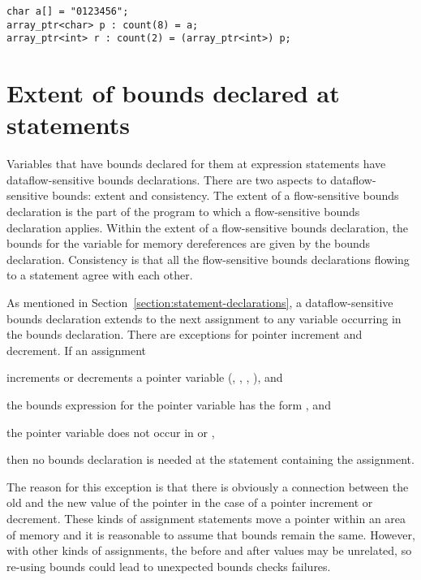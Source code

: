 \begin{lstlisting}
char a[] = "0123456";
array_ptr<char> p : count(8) = a;
array_ptr<int> r : count(2) = (array_ptr<int>) p;
\end{lstlisting}

\section{Extent of bounds declared at statements}
\label{section:extent-of-declarations}

Variables that have bounds declared for them at expression statements
have dataflow-sensitive bounds declarations. There are two aspects to
dataflow-sensitive bounds: extent and consistency. The extent of a
flow-sensitive bounds declaration is the part of the program to which
a flow-sensitive bounds
declaration applies. Within the extent of a flow-sensitive
bounds declaration, the
bounds for the variable for memory dereferences are given by the bounds
declaration. Consistency is that all the flow-sensitive bounds
declarations flowing to a statement agree with each other.

As mentioned in Section~\ref{section:statement-declarations},
a dataflow-sensitive bounds declaration
extends to the next assignment to any variable occurring in the bounds
declaration. There are exceptions for pointer increment and decrement.
If an assignment

\begin{compactitem}
\item
  increments or decrements a pointer variable (\code{++},
  \code{--}, \code{+=}, \code{-=}), and
\item
  the bounds expression for the pointer variable has the form
  , and
\item
  the pointer variable does not occur in  or ,
\end{compactitem}

then no bounds declaration is needed at the statement containing the
assignment.

The reason for this exception is that there is obviously a connection
between the old and the new value of the pointer in the case of a
pointer increment or decrement. These kinds of assignment statements
move a pointer within an area of memory and it is reasonable to assume
that bounds remain the same. However, with other kinds of assignments,
the before and after values may be unrelated, so re-using bounds could
lead to unexpected bounds checks failures.

